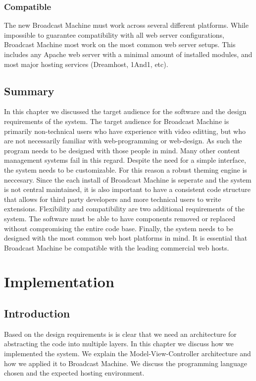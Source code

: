 \documentclass[a4paper,12pt]{report}
\begin{document}
\subsection{Compatible}
The new Broadcast Machine must work across several different platforms. 
While impossible to guarantee compatibility with all web server configurations, Broadcast Machine most work on the most common web server setups. 
This includes any Apache web server with a minimal amount of installed modules, and most major hosting services (Dreamhost, 1And1, etc). 

\section{Summary}
In this chapter we discussed the target audience for the software and the design requirements of the system. The target audience for 
Broadcast Machine is primarily non-technical users who have experience with 
video editting, but who are not 
necessarily familiar with web-programming or web-design. As such the program needs to be designed with those people in mind.
Many other content management systems fail in this regard. Despite the need for a simple interface, the system needs to be 
customizable. For this reason a robust theming engine is neccesary. Since the each install of Broadcast Machine is seperate and the system 
is not central maintained, it is also important 
to have a consistent code structure that allows for third party developers and more technical users to write extensions. 
Flexibility and compatibility are two additional requirements of the system. The software must be able to 
have components removed or 
replaced without compromising the entire code base. Finally, the system needs to be designed with the most common web host platforms in 
mind. It is essential that Broadcast Machine be compatible with the leading commercial web hosts.

\chapter{Implementation}

\section{Introduction}
Based on the design requirements is is clear that we need an architecture for abstracting the code into multiple layers. In this chapter 
we discuss how we implemented the system. We explain the Model-View-Controller architecture and how we applied it to 
Broadcast Machine. We discuss the programming language chosen and the expected hosting environment. 
\end{document}
